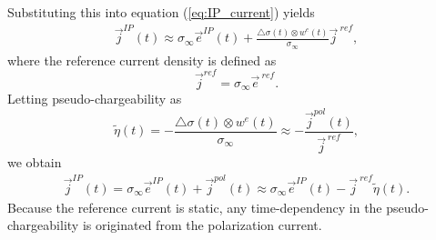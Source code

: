 \documentclass[a4paper, 11pt]{article}
\newcommand{\siginf}{\sigma_\infty}
\newcommand{\dsig}{\triangle\sigma}
\renewcommand {\j}  { {\vec j} }
\newcommand {\e}  { {\vec e} }
\newcommand{\peta}{\tilde{\eta}}
\newcommand{\eref}{\e^{\ ref}}
\begin{document}
Substituting this into equation (\ref{eq:IP_current}) yields
\begin{eqnarray*}
  \j^{IP}(t) \approx \siginf\e^{IP}(t) + \frac{\dsig(t)\otimes w^e(t)}{\siginf}\j^{\ ref},
\end{eqnarray*}
where the reference current density is defined as
\begin{equation}
  \j^{ref} = \siginf\eref.
\end{equation}
Letting pseudo-chargeability as
\begin{equation}
    \peta(t) = -\frac{\dsig(t)\otimes w^e(t)}{\siginf} \approx -\frac{\j^{pol}(t)}{\j^{\ ref}},
    \label{eq: pseudochargeability}
\end{equation}
we obtain
\begin{eqnarray}
  \j^{IP}(t) = \siginf\e^{IP}(t) + \j^{pol}(t) \approx \siginf\e^{IP}(t) -\j^{\ ref}\peta(t).
  \label{eq: jip_EMIP}
\end{eqnarray}
Because the reference current is static, any time-dependency in the pseudo-chargeability is originated from the polarization current. 
\end{document}
